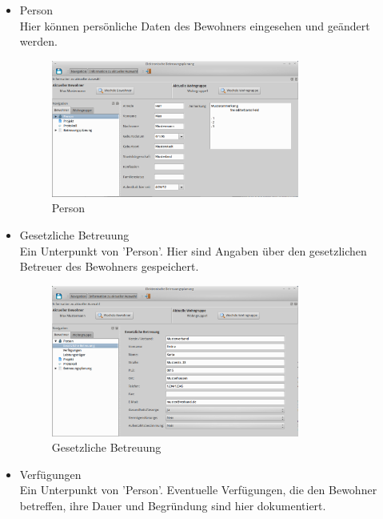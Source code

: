 \begin{itemize}
	\item Person\mbox{}\\
	\noindent
	Hier können persönliche Daten des Bewohners eingesehen und geändert werden.
	\begin{figure}[h]
		\begin{center}
			\includegraphics[keepaspectratio=true, width=0.77\textwidth]{pics/client_person.png}
			\caption{Person}
		\end{center}
	\end{figure}
	\FloatBarrier
	\item Gesetzliche Betreuung\mbox{}\\
	\noindent
	Ein Unterpunkt von 'Person'. Hier sind Angaben über den gesetzlichen Betreuer des Bewohners gespeichert.
	\begin{figure}[h]
		\begin{center}
			\includegraphics[keepaspectratio=true, width=0.77\textwidth]{pics/client_betreuung.png}
			\caption{Gesetzliche Betreuung}
		\end{center}
	\end{figure}
	\FloatBarrier
	\item Verfügungen\mbox{}\\
	\noindent
	Ein Unterpunkt von 'Person'. Eventuelle Verfügungen, die den Bewohner betreffen, ihre Dauer und Begründung sind hier dokumentiert.

\end{itemize}
